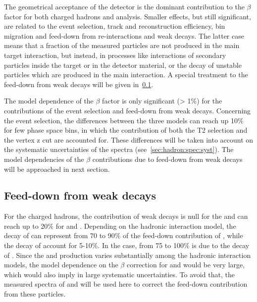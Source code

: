 The geometrical acceptance of the detector
is the dominant contribution to the $\beta$ factor
for both charged hadrons and \vzero analysis.
Smaller effects, but still significant, are related
to the event selection, track and \vzero reconstruction efficiency, 
bin migration and feed-down from re-interactions and weak decays.
The latter case means that a fraction of the measured particles
are not produced in the main target interaction, but instead,
in processes like interactions of secondary particles inside
the target or in the detector material, or the decay of unstable
particles which are produced in the main interaction.
A special treatment to the feed-down from weak decays
will be given in~\cref{sec:hadron:correction:fd}. 

The model dependence of the $\beta$ factor is only significant (> 1\%) for the
contributions of the event selection and feed-down from weak decays.
Concerning the event selection, the differences between the three models
can reach up 10\% for few phase space bins, in which the contribution
of both the T2 selection and the vertex z cut are accounted for.
These differences will be taken into account on the systematic uncertainties
of the spectra (see~\cref{sec:hadron:spec:syst}).
The model dependencies of the $\beta$ contributions due to feed-down
from weak decays will be approached in next section.


\subsection{Feed-down from weak decays}
\label{sec:hadron:correction:fd}

For the charged hadrons, the contribution of weak decays
is null for the \kaons and can reach up to 20\% for \pions and
\protonpm. Depending on the hadronic interaction model,
the decay of \kzeros can represent from 70 to 90\% of the
feed-down contribution of \pions, while the decay of \lambs account
for 5-10\%. In the \protonpm case, from 75 to 100\% is due to the decay
of \lambs.
Since the \lambs and \kzeros production varies substantially 
among the hadronic interaction models, the model dependence
on the $\beta$ correction for \pions and \protonpm would
be very large, which would also imply in large
systematic uncertainties. To avoid that, the
measured spectra of \lambs and \kzeros will be used here
to correct the feed-down contribution from these particles.


